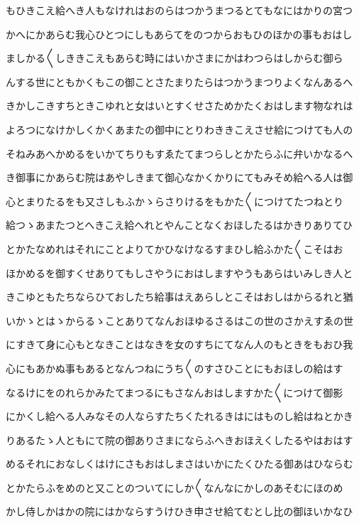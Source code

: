 \documentclass[a4paper,11pt,landscape]{ltjtarticle}
\begin{document}
もひきこえ給へき人もなけれはおのらはつかうまつるとてもなにはかりの宮つ
\par\medskip
かへにかあらむ我心ひとつにしもあらてをのつからおもひのほかの事もおはし
\par\medskip
ましかる〱しききこえもあらむ時にはいかさまにかはわつらはしからむ御ら
\par\medskip
んする世にともかくもこの御ことさたまりたらはつかうまつりよくなんあるへ
\par\medskip
きかしこきすちときこゆれと女はいとすくせさためかたくおはします物なれは
\par\medskip
よろつになけかしくかくあまたの御中にとりわききこえさせ給につけても人の
\par\medskip
そねみあへかめるをいかてちりもすゑたてまつらしとかたらふに弁いかなるへ
\par\medskip
き御事にかあらむ院はあやしきまて御心なかくかりにてもみそめ給へる人は御
\par\medskip
心とまりたるをも又さしもふかゝらさりけるをもかた〱につけてたつねとり
\par\medskip
給つゝあまたつとへきこえ給へれとやんことなくおほしたるはかきりありてひ
\par\medskip
とかたなめれはそれにことよりてかひなけなるすまひし給ふかた〱こそはお
\par\medskip
ほかめるを御すくせありてもしさやうにおはしますやうもあらはいみしき人と
\par\medskip
きこゆともたちならひておしたち給事はえあらしとこそはおしはからるれと猶
\par\medskip
いかゝとはゝからるゝことありてなんおほゆるさるはこの世のさかえすゑの世
\par\medskip
にすきて身に心もとなきことはなきを女のすちにてなん人のもときをもおひ我
\par\medskip
心にもあかぬ事もあるとなんつねにうち〱のすさひことにもおほしの給はす
\par\medskip
なるけにをのれらかみたてまつるにもさなんおはしますかた〱につけて御影
\par\medskip
にかくし給へる人みなその人ならすたちくたれるきはにはものし給はねとかき
\par\medskip
りあるたゝ人ともにて院の御ありさまにならふへきおほえくしたるやはおはす
\par\medskip
めるそれにおなしくはけにさもおはしまさはいかにたくひたる御あはひならむ
\par\medskip
とかたらふをめのと又ことのついてにしか〱なんなにかしのあそむにほのめ
\par\medskip
かし侍しかはかの院にはかならすうけひき申させ給てむとし比の御ほいかなひ
\end{document}
